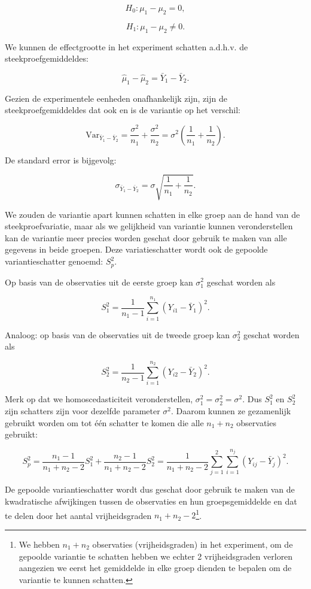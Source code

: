\documentclass[
  dutch,
  letterpaper,
  12pt]{book}
\theoremstyle{definition}
\theoremstyle{definition}
\theoremstyle{definition}
\theoremstyle{remark}
\begin{document}
\[H_0: \mu_1-\mu_2 = 0,\]

\[H_1: \mu_1-\mu_2 \neq 0.\]

We kunnen de effectgrootte in het experiment schatten a.d.h.v. de
steekproefgemiddeldes:

\[\hat \mu_1-\hat \mu_2=\bar Y_1 -\bar Y_2.\]

Gezien de experimentele eenheden onafhankelijk zijn, zijn de
steekproefgemiddeldes dat ook en is de variantie op het verschil:

\[\text{Var}_{\bar Y_1 -\bar Y_2}=\frac{\sigma^2}{n_1}+\frac{\sigma^2}{n_2}=\sigma^2 \left(\frac{1}{n_1}+\frac{1}{n_2}\right).\]

De standard error is bijgevolg:

\[\sigma_{\bar Y_1 -\bar Y_2}=\sigma\sqrt{\frac{1}{n_1}+\frac{1}{n_2}}.\]

We zouden de variantie apart kunnen schatten in elke groep aan de hand
van de steekproefvariatie, maar als we gelijkheid van variantie kunnen
veronderstellen kan de variantie meer precies worden geschat door
gebruik te maken van alle gegevens in beide groepen. Deze
variatieschatter wordt ook de gepoolde variantieschatter genoemd:
\(S^2_p\).

Op basis van de observaties uit de eerste groep kan \(\sigma^2_1\)
geschat worden als

\[S_1^2 = \frac{1}{n_1-1}\sum_{i=1}^{n_1} (Y_{i1}-\bar{Y}_1)^2.\]

Analoog: op basis van de observaties uit de tweede groep kan
\(\sigma^2_2\) geschat worden als

\[S_2^2 = \frac{1}{n_2-1}\sum_{i=1}^{n_2} (Y_{i2}-\bar{Y}_2)^2.\]

Merk op dat we homoscedasticiteit veronderstellen,
\(\sigma_1^2=\sigma_2^2=\sigma^2\). Dus \(S_1^2\) en \(S_2^2\) zijn
schatters zijn voor dezelfde parameter \(\sigma^2\). Daarom kunnen ze
gezamenlijk gebruikt worden om tot één schatter te komen die alle
\(n_1+n_2\) observaties gebruikt:

\[  S_p^2 = \frac{n_1-1}{n_1+n_2-2} S_1^2 + \frac{n_2-1}{n_1+n_2-2} S_2^2 = \frac{1}{n_1+n_2-2}\sum_{j=1}^2\sum_{i=1}^{n_j} (Y_{ij} - \bar{Y}_j)^2.\]

De gepoolde variantieschatter wordt dus geschat door gebruik te maken
van de kwadratische afwijkingen tussen de observaties en hun
groepsgemiddelde en dat te delen door het aantal vrijheidsgraden
\(n_1+n_2-2\)\footnote{We hebben \(n_1+n_2\) observaties
  (vrijheidsgraden) in het experiment, om de gepoolde variantie te
  schatten hebben we echter 2 vrijheidsgraden verloren aangezien we
  eerst het gemiddelde in elke groep dienden te bepalen om de variantie
  te kunnen schatten.}.
\end{document}
